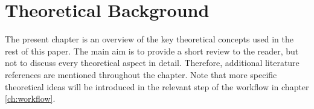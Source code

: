 \chapter{Theoretical Background}
The present chapter is an overview of the key theoretical concepts used in the rest of this paper.
The main aim is to provide a short review to the reader, but not to discuss every theoretical aspect in detail.
Therefore, additional literature references are mentioned throughout the chapter.
Note that more specific theoretical ideas will be introduced in the relevant step of the workflow in chapter \ref{ch:workflow}.





